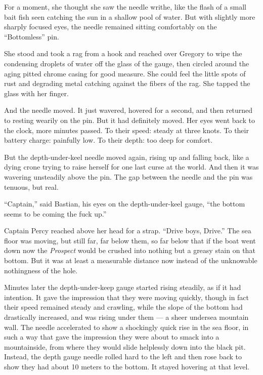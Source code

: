 \documentclass[]{article}
\begin{document}
\begin{multicols}{2}
For a moment, she thought she saw the needle writhe, like the flash of a
small bait fish seen catching the sun in a shallow pool of water. But
with slightly more sharply focused eyes, the needle remained sitting
comfortably on the ``Bottomless'' pin.

She stood and took a rag from a hook and reached over Gregory to wipe
the condensing droplets of water off the glass of the gauge, then
circled around the aging pitted chrome casing for good measure. She
could feel the little spots of rust and degrading metal catching against
the fibers of the rag. She tapped the glass with her finger.

And the needle moved. It just wavered, hovered for a second, and then
returned to resting wearily on the pin. But it had definitely moved. Her
eyes went back to the clock, more minutes passed. To their speed: steady
at three knots. To their battery charge: painfully low. To their depth:
too deep for comfort.

But the depth-under-keel needle moved again, rising up and falling back,
like a dying crone trying to raise herself for one last curse at the
world. And then it was wavering unsteadily above the pin. The gap
between the needle and the pin was tenuous, but real.

``Captain,'' said Bastian, his eyes on the depth-under-keel gauge, ``the
bottom seems to be coming the fuck up.''

Captain Percy reached above her head for a strap. ``Drive boys, Drive.''
The sea floor was moving, but still far, far below them, so far below
that if the boat went down now the \emph{Prospect} would be crushed into
nothing but a greasy stain on that bottom. But it was at least a
measurable distance now instead of the unknowable nothingness of the
hole.

Minutes later the depth-under-keep gauge started rising steadily, as if
it had intention. It gave the impression that they were moving quickly,
though in fact their speed remained steady and crawling, while the slope
of the bottom had drastically increased, and was rising under them --- a
sheer undersea mountain wall. The needle accelerated to show a
shockingly quick rise in the sea floor, in such a way that gave the
impression they were about to smack into a mountainside, from where they
would slide helplessly down into the black pit. Instead, the depth gauge
needle rolled hard to the left and then rose back to show they had about
10 meters to the bottom. It stayed hovering at that level.


\end{multicols}
\end{document}
